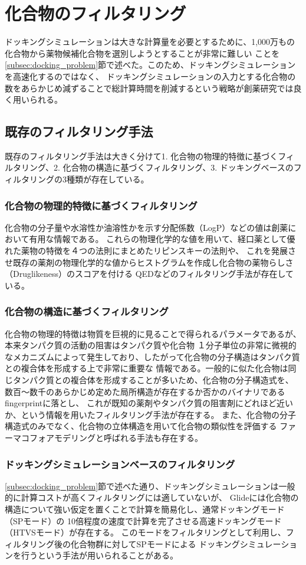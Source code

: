\section{化合物のフィルタリング}
ドッキングシミュレーションは大きな計算量を必要とするために、1,000万もの化合物から薬物候補化合物を選別しようとすることが非常に難しい
ことを\ref{subsec:docking_problem}節で述べた。このため、ドッキングシミュレーションを高速化するのではなく、
ドッキングシミュレーションの入力とする化合物の数をあらかじめ減ずることで総計算時間を削減するという戦略が創薬研究では良く用いられる。

\subsection{既存のフィルタリング手法}\label{subsec:existing_filtering}
既存のフィルタリング手法は大きく分けて1. 化合物の物理的特徴に基づくフィルタリング、2. 化合物の構造に基づくフィルタリング、3. ドッキングベースのフィルタリングの3種類が存在している。
\subsubsection{化合物の物理的特徴に基づくフィルタリング}
化合物の分子量や水溶性か油溶性かを示す分配係数（LogP）などの値は創薬において有用な情報である。
これらの物理化学的な値を用いて、経口薬として優れた薬物の特徴を４つの法則にまとめたリピンスキーの法則\cite{Lipinski1997}や、
これを発展させ既存の薬剤の物理化学的な値からヒストグラムを作成し化合物の薬物らしさ（Druglikeness）のスコアを付ける
QED\cite{Bickerton2012}などのフィルタリング手法が存在している。
\subsubsection{化合物の構造に基づくフィルタリング}
化合物の物理的特徴は物質を巨視的に見ることで得られるパラメータであるが、本来タンパク質の活動の阻害はタンパク質や化合物
１分子単位の非常に微視的なメカニズムによって発生しており、したがって化合物の分子構造はタンパク質との複合体を形成する上で非常に重要な
情報である。一般的に似た化合物は同じタンパク質との複合体を形成することが多いため、化合物の分子構造式を、
数百～数千のあらかじめ定めた局所構造が存在するか否かのバイナリであるfingerprintに落とし、
これが既知の薬剤やタンパク質の阻害剤にどれほど近いか、という情報を用いたフィルタリング手法が存在する\cite{Nilakantan1993}。
また、化合物の分子構造式のみでなく、化合物の立体構造を用いて化合物の類似性を評価する
ファーマコフォアモデリングと呼ばれる手法も存在する\cite{Parenti2003}。
\subsubsection{ドッキングシミュレーションベースのフィルタリング}
\ref{subsec:docking_problem}節で述べた通り、ドッキングシミュレーションは一般的に計算コストが高くフィルタリングには適していないが、
Glideには化合物の構造について強い仮定を置くことで計算を簡易化し、通常ドッキングモード（SPモード）の
10倍程度の速度で計算を完了させる高速ドッキングモード（HTVSモード）が存在する。
このモードをフィルタリングとして利用し、フィルタリング後の化合物群に対してSPモードによる
ドッキングシミュレーションを行うという手法が用いられることがある\cite{Fujimoto2008}。

